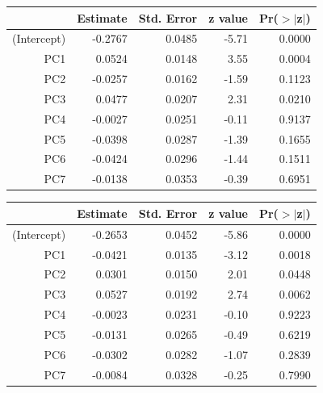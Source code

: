 \documentclass[a4paper,12pt]{Latex/Classes/PhDthesisPSnPDF}
\begin{document}
\begin{center}
\begin{table}[ht]
\centering
\begin{tabular}{rrrrr}
  \hline
 & Estimate & Std. Error & z value & Pr($>$$|$z$|$) \\ 
  \hline
(Intercept) & -0.2767 & 0.0485 & -5.71 & 0.0000 \\ 
  PC1 & 0.0524 & 0.0148 & 3.55 & 0.0004 \\ 
  PC2 & -0.0257 & 0.0162 & -1.59 & 0.1123 \\ 
  PC3 & 0.0477 & 0.0207 & 2.31 & 0.0210 \\ 
  PC4 & -0.0027 & 0.0251 & -0.11 & 0.9137 \\ 
  PC5 & -0.0398 & 0.0287 & -1.39 & 0.1655 \\ 
  PC6 & -0.0424 & 0.0296 & -1.44 & 0.1511 \\ 
  PC7 & -0.0138 & 0.0353 & -0.39 & 0.6951 \\ 
   \hline
\end{tabular}
\end{table}\end{center}
\newpage
\begin{center}
\begin{table}[ht]
\centering
\begin{tabular}{rrrrr}
  \hline
 & Estimate & Std. Error & z value & Pr($>$$|$z$|$) \\ 
  \hline
(Intercept) & -0.2653 & 0.0452 & -5.86 & 0.0000 \\ 
  PC1 & -0.0421 & 0.0135 & -3.12 & 0.0018 \\ 
  PC2 & 0.0301 & 0.0150 & 2.01 & 0.0448 \\ 
  PC3 & 0.0527 & 0.0192 & 2.74 & 0.0062 \\ 
  PC4 & -0.0023 & 0.0231 & -0.10 & 0.9223 \\ 
  PC5 & -0.0131 & 0.0265 & -0.49 & 0.6219 \\ 
  PC6 & -0.0302 & 0.0282 & -1.07 & 0.2839 \\ 
  PC7 & -0.0084 & 0.0328 & -0.25 & 0.7990 \\ 
   \hline
\end{tabular}
\end{table}\end{center}
\end{document}
